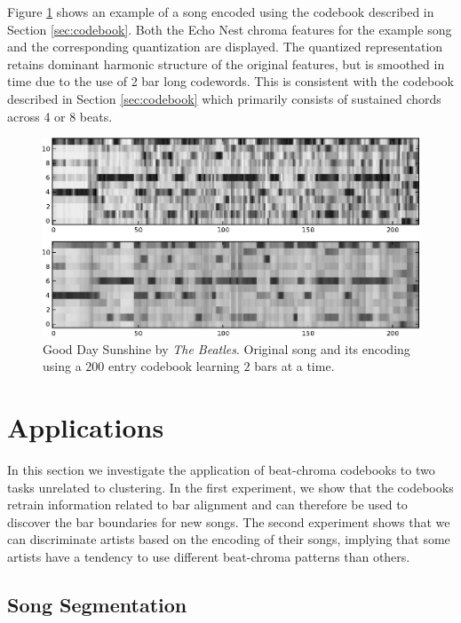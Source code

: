 \documentclass{article}
\begin{document}
Figure \ref{fig:encodesong} shows an example of a song encoded
using the codebook described in Section \ref{sec:codebook}.  Both the
Echo Nest chroma features for the example song and the corresponding
quantization are displayed.  The quantized representation retains
dominant harmonic structure of the original features, but is smoothed
in time due to the use of 2 bar long codewords.
%
This is consistent with the codebook described in Section
\ref{sec:codebook} which primarily consists of sustained chords across
4 or 8 beats.

\begin{figure}[t]
\begin{center}
\includegraphics[width=.9\columnwidth]{song_encoded}
\end{center}
\caption{\small{Good Day Sunshine by \textit{The Beatles}.
Original song and its encoding using a $200$ entry codebook learning
$2$ bars at a time.
}}
\label{fig:encodesong}
\end{figure}


\section{Applications}\label{sec:exps2}
In this section we investigate the application of beat-chroma
codebooks to two tasks unrelated to clustering.
%
In the first experiment, we show that the codebooks retrain
information related to bar alignment and can therefore be used to
discover the bar boundaries for new songs.  The second experiment
shows that we can discriminate artists based on the encoding of their
songs, implying that some artists have a tendency to use different
beat-chroma patterns than others.



\subsection{Song Segmentation} \label{ssec:segment}
\end{document}

